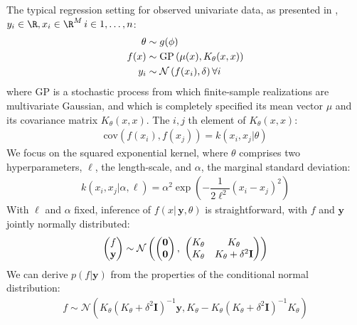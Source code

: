 \documentclass{article}
\newcommand{\lp}{\ensuremath{\left(}}
\newcommand{\rp}{\ensuremath{\right)}}
\begin{document}
The typical regression setting for observed univariate data, as presented in \citet{flaxman2015fast},
$y_i \in \R, x_i \in \R^M\, i \in {1,\dots,n}$:
\begin{align*}
  \theta & \sim g(\phi) \\
  f(x) & \sim \text{GP}\lp \mu(x),
  K_\theta(x, x) \rp \\
  y_i & \sim \mathcal{N}\lp f(x_i), \delta \rp \forall i \\
\end{align*}
where $\text{GP}$ is a stochastic process from which finite-sample realizations are
multivariate Gaussian, and which is completely specified its mean vector $\mu$
and its covariance matrix $K_\theta(x, x)$. The $i, j$ th
element of $K_\theta(x, x)$:
\begin{align*}
  \text{cov}(f(x_i), f(x_j)) = k(x_i, x_j | \theta) 
\end{align*}
We focus on the squared exponential kernel, where $\theta$ comprises
two hyperparameters, $\ell$, the length-scale, and $\alpha$, the marginal
standard deviation:
\begin{align} \label{kern}
  k(x_i, x_j | \alpha, \ell) = \alpha^2 
\exp \left(
	- \dfrac{1}{2\ell^2} (x_{i} - x_{j})^2
\right)
\end{align}
With $\ell$ and $\alpha$ fixed, inference of $f(x | \, \mathbf{y}, \theta)$ is
straightforward, with $f$ and $\mathbf{y}$ jointly normally distributed:
\begin{align*} \begin{pmatrix} f\\ \mathbf{y} \\ \end{pmatrix} \sim
\mathcal{N} \lp \begin{pmatrix} \mathbf{0} \\ \mathbf{0} \end{pmatrix} ,\,\,
  \begin{pmatrix} K_\theta &
  K_\theta  \\ K_\theta &
  K_\theta + \delta ^ 2 \mathbf{I}\\ \end{pmatrix} \rp
\end{align*}
We can derive $p(f | \mathbf{y})$ from the properties of the conditional normal
distribution: 
\begin{align*}
  f \sim
  \mathcal{N}(K_\theta  (K_\theta + \delta ^ 2 \mathbf{I})^{-1}\mathbf{y},  
  K_\theta - K_\theta (K_\theta + \delta ^ 2 \mathbf{I})^{-1}K_\theta)
\end{align*}
\end{document}

